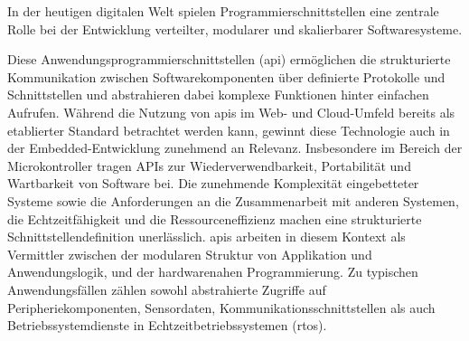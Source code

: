

In der heutigen digitalen Welt spielen Programmierschnittstellen eine zentrale Rolle bei der Entwicklung verteilter, modularer und skalierbarer Softwaresysteme. 

Diese Anwendungsprogrammierschnittstellen (\gls{api}) ermöglichen die strukturierte Kommunikation zwischen Softwarekomponenten über definierte Protokolle und Schnittstellen und abstrahieren dabei komplexe Funktionen hinter einfachen Aufrufen.
Während die Nutzung von \gls{api}s im Web- und Cloud-Umfeld bereits als etablierter Standard betrachtet werden kann, gewinnt diese Technologie auch in der Embedded-Entwicklung zunehmend an Relevanz.
Insbesondere im Bereich der Microkontroller tragen APIs zur Wiederverwendbarkeit, Portabilität und Wartbarkeit von Software bei.
Die zunehmende Komplexität eingebetteter Systeme sowie die Anforderungen an die Zusammenarbeit mit anderen Systemen, die Echtzeitfähigkeit und  die Ressourceneffizienz machen eine strukturierte Schnittstellendefinition unerlässlich.
\gls{api}s arbeiten in diesem Kontext als Vermittler zwischen der modularen Struktur von Applikation und Anwendungslogik, und der hardwarenahen Programmierung.
Zu typischen Anwendungsfällen zählen sowohl abstrahierte Zugriffe auf Peripheriekomponenten, Sensordaten, Kommunikationsschnittstellen als auch Betriebssystemdienste in Echtzeitbetriebssystemen (\gls{rtos}).